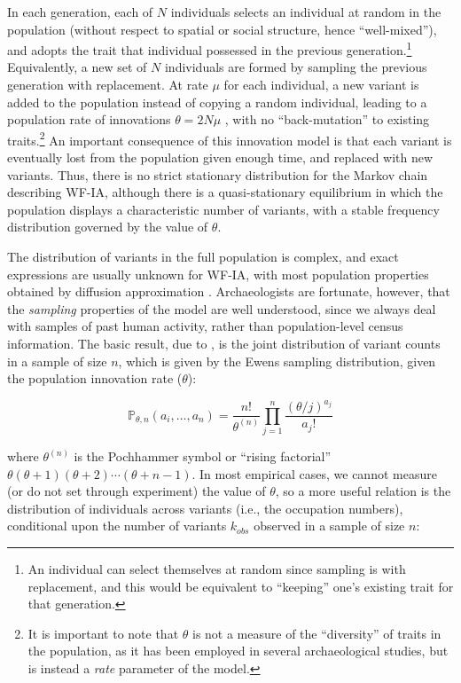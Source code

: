 In each generation, each of $N$ individuals selects an individual at random in the population (without respect to spatial or social structure, hence ``well-mixed''), and adopts the trait that individual possessed in the previous generation.\footnote{An individual can select themselves at random since sampling is with replacement, and this would be equivalent to ``keeping'' one's existing trait for that generation.}  Equivalently, a new set of $N$ individuals are formed by sampling the previous generation with replacement.  At rate $\mu$ for each individual, a new variant is added to the population instead of copying a random individual, leading to a population rate of innovations $\theta = 2N\mu$ \citep{Ewens2004}, with no ``back-mutation'' to existing traits.\footnote{It is important to note that $\theta$ is not a measure of the ``diversity'' of traits in the population, as it has been employed in several archaeological studies, but is instead a \emph{rate} parameter of the model.}  An important consequence of this innovation model is that each variant is eventually lost from the population given enough time, and replaced with new variants.  Thus, there is no strict stationary distribution for the Markov chain describing WF-IA, although there is a quasi-stationary equilibrium in which the population displays a characteristic number of variants, with a stable frequency distribution governed by the value of $\theta$.  

The distribution of variants in the full population is complex, and exact expressions are usually unknown for WF-IA, with most population properties obtained by diffusion approximation \citep{Ewens2004}.  Archaeologists are fortunate, however, that the \emph{sampling} properties of the model are well understood, since we always deal with samples of past human activity, rather than population-level census information.  The basic result, due to \citet{ewens1972sampling}, is the joint distribution of variant counts in a sample of size $n$, which is given by the Ewens sampling distribution, given the population innovation rate ($\theta$):

\begin{equation}
\label{eq:esd}
\mathbb{P}_{\theta,n}(a_i, \ldots, a_n) = \frac{n!}{\theta^{(n)}} \prod^n_{j=1} \frac{(\theta/j)^{a_j}}{a_j!}
\end{equation}

where $\theta^{(n)}$ is the Pochhammer symbol or ``rising factorial'' $\theta(\theta+1)(\theta + 2)\cdots(\theta + n - 1)$.  In most empirical cases, we cannot measure (or do not set through experiment) the value of $\theta$, so a more useful relation is the distribution of individuals across variants (i.e., the occupation numbers), conditional upon the number of variants $k_{obs}$ observed in a sample of size $n$:

